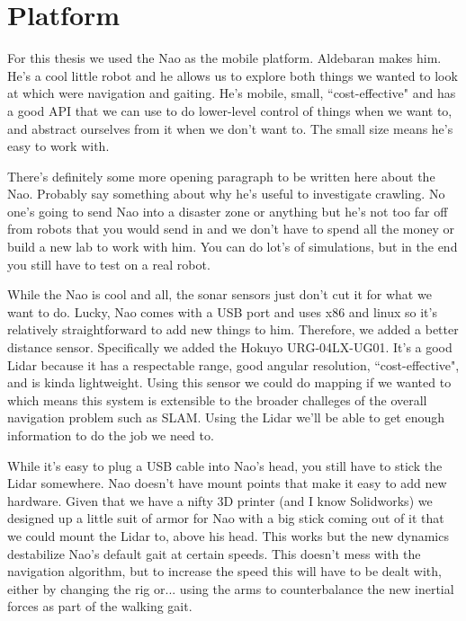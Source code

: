 
\chapter{Platform} \label{ch:platform}

For this thesis we used the Nao as the mobile platform. Aldebaran makes him.
He's a cool little robot and he allows us to explore both things we wanted to 
look at which were navigation and gaiting. He's mobile, small, ``cost-effective"
and has a good API that we can use to do lower-level control of things when we want to, 
and abstract ourselves from it when we don't want to.
The small size means he's easy to work with.

There's definitely some more opening paragraph to be written here about the Nao.
Probably say something about why he's useful to investigate crawling.
No one's going to send Nao into a disaster zone or anything but he's not too
far off from robots that you would send in and we don't have to spend all the 
money or build a new lab to work with him. You can do lot's of simulations, 
but in the end you still have to test on a real robot.

While the Nao is cool and all, the sonar sensors just don't cut it for what we want to do.
Lucky, Nao comes with a USB port and uses x86 and linux so it's relatively
straightforward to add new things to him. Therefore, we added a better distance sensor.
Specifically we added the Hokuyo URG-04LX-UG01.
It's a good Lidar because it has a respectable range, good angular resolution,
``cost-effective", and is kinda lightweight. Using this sensor we could do mapping 
if we wanted to which means this system is extensible to the broader challeges 
of the overall navigation problem such as SLAM. Using the Lidar we'll be able to 
get enough information to do the job we need to.

While it's easy to plug a USB cable into Nao's head, you still have to stick the Lidar somewhere.
Nao doesn't have mount points that make it easy to add new hardware.
Given that we have a nifty 3D printer (and I know Solidworks) we designed up a little suit of
armor for Nao with a big stick coming out of it that we could mount the Lidar to, above his head.
This works but the new dynamics destabilize Nao's default gait at certain speeds. 
This doesn't mess with the navigation algorithm, but to increase the speed this will have to be dealt with,
either by changing the rig or... using the arms to counterbalance the new inertial forces as
part of the walking gait.

